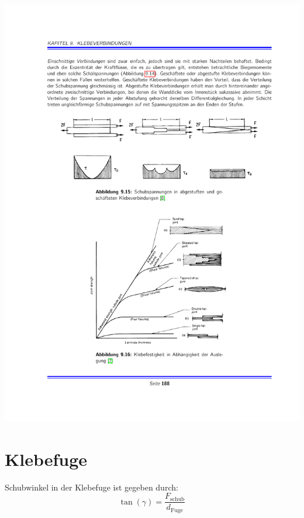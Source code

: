 	\includegraphics[width=\columnwidth]{graphics/klebefestigkeit}
\section{Klebefuge} %
	Schubwinkel in der Klebefuge ist gegeben durch:
	\begin{equation*}
		\tan(\gamma) = \frac{F_\text{schub}}{d_\text{Fuge}}
	\end{equation*}
